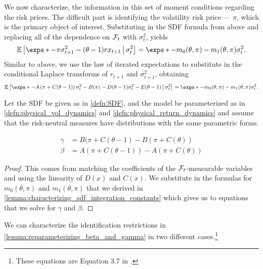 \documentclass[11pt, letterpaper, twoside]{article}
\begin{document}
We now characterize, the information in this set of moment conditions regarding the risk prices. The difficult part is identifying the volatility risk price --- $\pi$, which is the primary object of interest. Substituting in the SDF formula from above and replacing all of the dependence on $\mathcal{F}_t$ with $\sigma^2_t$, yields
%
\begin{equation}
    \E \left[ \exps*{ - \pi \sigma^2_{t+1} - (\theta - 1) rx_{t+1} } \mvert \sigma^2_t \right] = \exps*{- m_0(\theta, \pi) - m_1(\theta, \pi) \sigma^2_t}.
\end{equation}
%
Similar to above, we use the law of iterated expectations to substitute in the conditional Laplace transforms of $r_{t+1}$ and $\sigma^2_{t+1}$, obtaining
%
\begin{equation}
    \E\left[\exps*{- A\left(\pi + C(\theta -1)\right) \sigma^2_t - B(\pi) - D(\theta-1) \sigma^2_t - E(\theta-1)} \mvert \sigma^2_t \right] = \exps*{- m_0(\theta, \pi) - m_1(\theta, \pi) \sigma^2_t}. 
\end{equation}

\begin{lemma}
    \label{lemma:reparameterizing_beta_and_gamma}
    Let the SDF be given as in \cref{defn:SDF}, and the model be parameterized as in \cref{defn:physical_vol_dynamics} and \cref{defn:physical_return_dynamics} and assume that the risk-neutral measures have distributions with the same parametric forms. 
    
    
    \begin{align}
        \label{eqn:beta_function}
        \gamma &= B(\pi + C(\theta - 1) - B(\pi + C(\theta)) \\
        \label{eqn:gamma_function}
        \beta &= A(\pi + C(\theta -1)) - A(\pi + C(\theta)) 
    \end{align}
    
\end{lemma}

\begin{proof}
    This comes from matching the coefficients of the $\mathcal{F}_t$-measurable variables and using the linearity of $D(x)$ and $C(x)$.  We substitute in the formulas for $m_0(\theta, \pi)$ and $m_1(\theta, \pi)$ that we derived in \cref{lemma:characterizing_sdf_integration_constants} which gives us to equations that we solve for $\gamma$ and $\beta$.
\end{proof}
 
We can characterize the identification restrictions in \cref{lemma:reparameterizing_beta_and_gamma} in two different cases.\footnote{These equations are Equation 3.7 in \textcite{han2018leverage}.}
\end{document}
